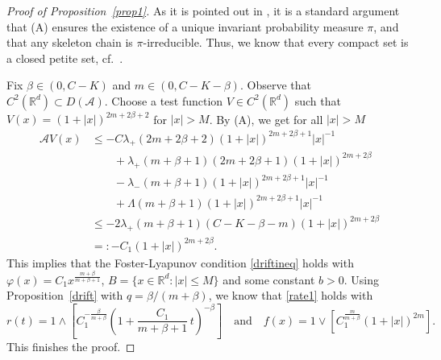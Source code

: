 \documentclass{aptpub}
\newcommand\R{\mathds R}
\numberwithin{equation}{section}
\begin{document}
\begin{proof}[Proof of Proposition~\ref{prop1}]
As it is pointed out in \cite[p.\ 908]{dou09}, it is a standard argument that \textup{(A)} ensures the existence of a unique invariant probability measure $\pi$, and that any skeleton chain is $\pi$-irreducible. Thus, we know that every compact set is a closed petite set, cf.\ \cite[Theorems 5.1 and 7.1]{twe94}.

Fix $\beta\in(0,C-K)$ and $m\in(0,C-K-\beta)$. Observe that $C^2(\R^d)\subset D(\mathscr{A})$. Choose a test function $V\in C^2(\R^d)$ such that $V(x)=\left(1+|x|\right)^{2m+2\beta+2}$ for $|x|>M$. By \textup{(A)}, we get for all $|x|>M$
\begin{align*}
    \mathscr{A} V(x)
    &\leq-C\lambda_{+}\left(2m+2\beta+2\right) \left(1+|x|\right)^{2m+2\beta+1}|x|^{-1}\\
    &\qquad\mbox{}+\lambda_{+}\left(m+\beta+1\right)(2m+2\beta+1)\left(1+|x|\right)^{2m+2\beta}\\
    &\qquad\mbox{}-\lambda_{-}\left(m+\beta+1\right)\left(1+|x|\right)^{2m+2\beta+1}|x|^{-1}\\
    &\qquad\mbox{}+\Lambda \left(m+\beta+1\right)\left(1+|x|\right)^{2m+2\beta+1}|x|^{-1}\\
    &\leq-2\lambda_+(m+\beta+1)(C-K-\beta-m)(1+|x|)^{2m+2\beta}\\
    &=:-C_1(1+|x|)^{2m+2\beta}.
\end{align*}
This implies that the Foster-Lyapunov condition \eqref{driftineq} holds with $\varphi(x)= C_1 x^{\frac{m+\beta}{m+\beta+1}}$, $B=\{x\in\R^d: |x|\leq M\}$ and some constant $b>0$. Using Proposition~\ref{drift} with $q=\beta/(m+\beta)$, we know that \eqref{rate1} holds with
$$
    r(t)= 1 \wedge \left[C_1^{-\frac{\beta}{m+\beta}}\left( 1+\frac{C_1}{m+\beta+1}\,t \right)^{-\beta}\right]
    \quad\text{and}\quad
    f(x)= 1\vee \left[C_1^{\frac{m}{m+\beta}}(1+|x|)^{2m}\right].
$$
This finishes the proof.
\end{proof}
\end{document}
